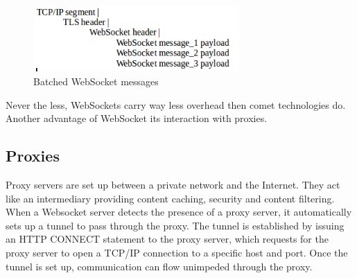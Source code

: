\vspace{10 mm}

\begin{figure}[H]
\centering
\includegraphics[width=0.7\textwidth]{./Figures/batched_websocket.png}
\caption[Batched WebSocket messages]{Batched WebSocket messages \citep{Reference30}}
\label{fig:batched_websocket}
\end{figure}

Never the less, WebSockets carry way less overhead then comet technologies do.
Another advantage of WebSocket its interaction with proxies.\\

\subsection{Proxies}

Proxy servers are set up between a private network and the Internet. They act
like an intermediary providing content caching, security and content
filtering.\\

When a Websocket server detects the presence of a proxy server, it
automatically sets up a tunnel to pass through the proxy. The tunnel is
established by issuing an HTTP CONNECT statement to the proxy server, which
requests for the proxy server to open a TCP/IP connection to a specific host
and port. Once the tunnel is set up, communication can flow unimpeded through
the proxy.\\


